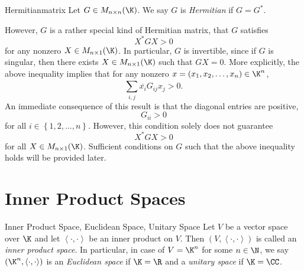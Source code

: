 \documentclass[linearalgebraII]{subfiles}
\begin{document}
    \begin{definition}{Hermitian}{matrix}
        Let $G\in M_{n\times n}(\K)$. We say $G$ is \emph{Hermitian} if $G=G^*$.
    \end{definition}

    \noindent However, $G$ is a rather special kind of Hermitian matrix, that $G$ satisfies
    \begin{equation*}
        X^*GX > 0
    \end{equation*}
    for any nonzero $X\in M_{n\times 1}(\K)$. In particular, $G$ is invertible, since if $G$ is singular, then there exists $X\in M_{n\times 1}(\K)$ such that $GX = 0$. More explicitly, the above inequality implies that for any nonzero $x = \left( x_1,x_2,\ldots,x_n \right) \in\K^n$,
    \begin{equation*}
        \sum^{}_{i,j} \overline{x_i}G_{ij}x_j > 0.
    \end{equation*}
    An immediate consequence of this result is that the diagonal entries are positive,
    \begin{equation*}
        G_{ii} > 0
    \end{equation*}
    for all $i\in \left\lbrace 1,2,\ldots,n \right\rbrace$. However, this condition solely does not guarantee
    \begin{equation*}
        X^*GX > 0
    \end{equation*}
    for all $X\in M_{n\times 1}(\K)$. Sufficient conditions on $G$ such that the above inequality holds will be provided later. 

    \section{Inner Product Spaces}
    
    \begin{definition}{Inner Product Space, Euclidean Space, Unitary Space}{}
        Let $V$ be a vector space over $\K$ and let $\left\langle \cdot, \cdot\right\rangle$ be an inner product on $V$. Then $\left( V, \left\langle \cdot, \cdot\right\rangle \right) $ is called an \emph{inner product space}. In particular, in case of $V=\K^n$ for some $n\in\N$, we say $\left( \K^n,\left\langle \cdot, \cdot\right\rangle  \right)$ is an \emph{Euclidean space} if $\K = \R$ and a \emph{unitary space} if $\K = \CC$.
    \end{definition}
\end{document}

